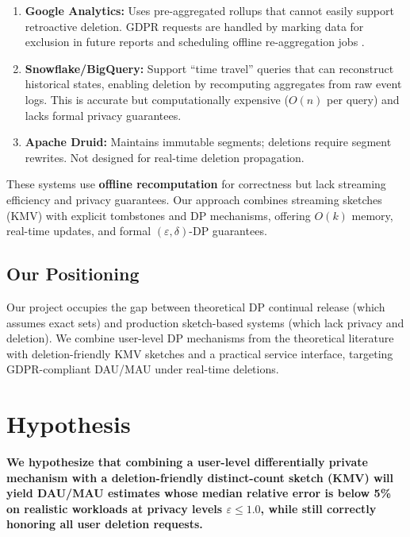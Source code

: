 \documentclass[11pt]{article}
\begin{document}
\begin{enumerate}[leftmargin=*]
    \item \textbf{Google Analytics:} Uses pre-aggregated rollups that cannot easily support retroactive deletion. GDPR requests are handled by marking data for exclusion in future reports and scheduling offline re-aggregation jobs \cite{datacalculus2023}.
    
    \item \textbf{Snowflake/BigQuery:} Support ``time travel'' queries that can reconstruct historical states, enabling deletion by recomputing aggregates from raw event logs. This is accurate but computationally expensive ($O(n)$ per query) and lacks formal privacy guarantees.
    
    \item \textbf{Apache Druid:} Maintains immutable segments; deletions require segment rewrites. Not designed for real-time deletion propagation.
\end{enumerate}

These systems use \textbf{offline recomputation} for correctness but lack streaming efficiency and privacy guarantees. Our approach combines streaming sketches (KMV) with explicit tombstones and DP mechanisms, offering $O(k)$ memory, real-time updates, and formal $(\varepsilon, \delta)$-DP guarantees.

\subsection{Our Positioning}

Our project occupies the gap between theoretical DP continual release (which assumes exact sets) and production sketch-based systems (which lack privacy and deletion). We combine user-level DP mechanisms from the theoretical literature with deletion-friendly KMV sketches and a practical service interface, targeting GDPR-compliant DAU/MAU under real-time deletions.

\newpage
\section{Hypothesis}

\textbf{We hypothesize that combining a user-level differentially private mechanism with a deletion-friendly distinct-count sketch (KMV) will yield DAU/MAU estimates whose median relative error is below 5\% on realistic workloads at privacy levels $\varepsilon \le 1.0$, while still correctly honoring all user deletion requests.}
\end{document}
